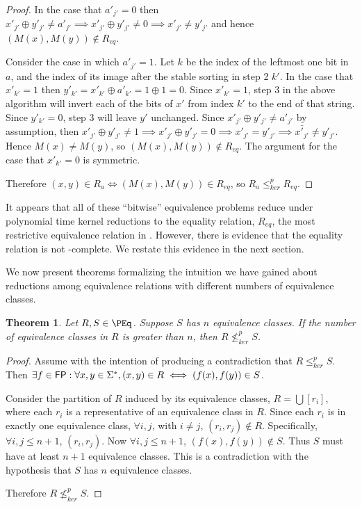 \documentclass{amsart}
\newtheorem{theorem}{Theorem}[section]
\theoremstyle{definition} \newtheorem{definition}[definition]{Definition}
\newcommand{\sigmastar}{\Sigma^{*}} %
\newcommand{\kr}{\leq^{p}_{ker}} %
\newcommand{\nkr}{\nleq^{p}_{ker}} %
\begin{document}
\begin{proof}
  In the case that $a'_{j'}=0$ then $x'_{j'}\oplus y'_{j'}\neq a'_{j'}\implies
  x'_{j'}\oplus y'_{j'}\neq 0\implies x'_{j'}\neq y'_{j'}$ and hence
  $(M(x),M(y))\notin R_{eq}$.

  Consider the case in which $a'_{j'}=1$. Let $k$ be the index of the leftmost
  one bit in $a$, and the index of its image after the stable sorting in step 2
  $k'$. In the case that $x'_{k'}=1$ then $y'_{k'}=x'_{k'}\oplus
  a'_{k'}=1\oplus1=0$. Since $x'_{k'}=1$, step 3 in the above algorithm will
  invert each of the bits of $x'$ from index $k'$ to the end of that
  string. Since $y'_{k'}=0$, step 3 will leave $y'$ unchanged. Since
  $x'_{j'}\oplus y'_{j'}\neq a'_{j'}$ by assumption, then $x'_{j'}\oplus
  y'_{j'}\neq 1\implies x'_{j'}\oplus y'_{j'}=0\implies x'_{j'}=y'_{j'}\implies
  \bar{x'_{j'}}\neq y'_{j'}$. Hence $M(x)\neq M(y)$, so $(M(x),M(y))\notin
  R_{eq}$. The argument for the case that $x'_{k'}=0$ is symmetric.

  Therefore $(x,y)\in R_a\iff(M(x),M(y))\in R_{eq}$, so $R_a\kr R_{eq}$.
\end{proof}

It appears that all of these ``bitwise'' equivalence problems reduce under
polynomial time kernel reductions to the equality relation, $R_{eq}$, the most
restrictive equivalence relation in \PEq. However, there is evidence\cite{fg09}
that the equality relation is not \PEq-complete. We restate this evidence in
the next section.

We now present theorems formalizing the intuition we have gained about
reductions among equivalence relations with different numbers of equivalence
classes.
\begin{theorem}
  Let $R,S\in\PEq$. Suppose $S$ has $n$ equivalence classes. If the number of
  equivalence classes in $R$ is greater than $n$, then $R\nkr S$.
\end{theorem}
\begin{proof}
  Assume with the intention of producing a contradiction that $R\kr S$. Then
  $\exists f\in\FP:\forall x,y\in\sigmastar, (x,y)\in R\iff (f(x),f(y))\in
  S$.

  Consider the partition of $R$ induced by its equivalence classes,
  $R=\bigcup{[r_i]}$, where each $r_i$ is a representative of an equivalence
  class in $R$. Since each $r_i$ is in exactly one equivalence class, $\forall
  i,j$, with $i\neq j$, $(r_i, r_j)\notin R$. Specifically, $\forall i,j \leq
  n+1$, $(r_i, r_j)$. Now $\forall i,j \leq n+1$, $(f(x),f(y))\notin S$. Thus
  $S$ must have at least $n+1$ equivalence classes. This is a contradiction
  with the hypothesis that $S$ has $n$ equivalence classes.

  Therefore $R\nkr S$.
\end{proof}
\end{document}
